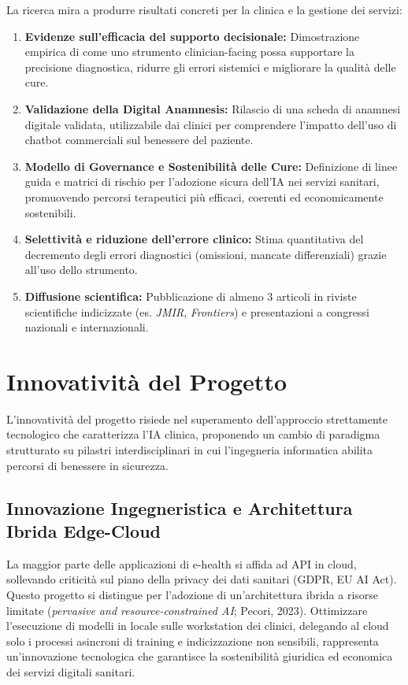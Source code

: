 \documentclass[11pt,a4paper]{article}
\begin{document}
La ricerca mira a produrre risultati concreti per la clinica e la gestione dei servizi:
\begin{enumerate}
    \item \textbf{Evidenze sull'efficacia del supporto decisionale:} Dimostrazione empirica di come uno strumento clinician-facing possa supportare la precisione diagnostica, ridurre gli errori sistemici e migliorare la qualità delle cure.
    \item \textbf{Validazione della Digital Anamnesis:} Rilascio di una scheda di anamnesi digitale validata, utilizzabile dai clinici per comprendere l'impatto dell'uso di chatbot commerciali sul benessere del paziente.
    \item \textbf{Modello di Governance e Sostenibilità delle Cure:} Definizione di linee guida e matrici di rischio per l'adozione sicura dell'IA nei servizi sanitari, promuovendo percorsi terapeutici più efficaci, coerenti ed economicamente sostenibili.
    \item \textbf{Selettività e riduzione dell'errore clinico:} Stima quantitativa del decremento degli errori diagnostici (omissioni, mancate differenziali) grazie all'uso dello strumento.
    \item \textbf{Diffusione scientifica:} Pubblicazione di almeno 3 articoli in riviste scientifiche indicizzate (es. \textit{JMIR}, \textit{Frontiers}) e presentazioni a congressi nazionali e internazionali.
\end{enumerate}

\section{Innovatività del Progetto}

L'innovatività del progetto risiede nel superamento dell'approccio strettamente tecnologico che caratterizza l'IA clinica, proponendo un cambio di paradigma strutturato su pilastri interdisciplinari in cui l'ingegneria informatica abilita percorsi di benessere in sicurezza.

\subsection{Innovazione Ingegneristica e Architettura Ibrida Edge-Cloud}
La maggior parte delle applicazioni di e-health si affida ad API in cloud, sollevando criticità sul piano della privacy dei dati sanitari (GDPR, EU AI Act). Questo progetto si distingue per l'adozione di un'architettura ibrida a risorse limitate (\textit{pervasive and resource-constrained AI}; Pecori, 2023). Ottimizzare l'esecuzione di modelli in locale sulle workstation dei clinici, delegando al cloud solo i processi asincroni di training e indicizzazione non sensibili, rappresenta un'innovazione tecnologica che garantisce la sostenibilità giuridica ed economica dei servizi digitali sanitari.
\end{document}
